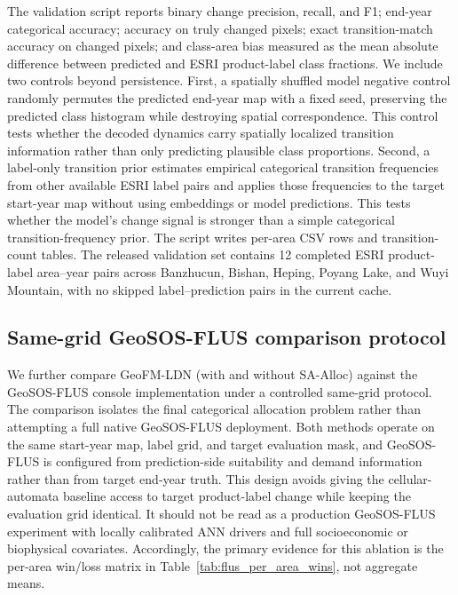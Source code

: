 \documentclass{article}
\begin{document}
The validation script reports binary change precision, recall, and F1; end-year categorical accuracy; accuracy on truly changed pixels; exact transition-match accuracy on changed pixels; and class-area bias measured as the mean absolute difference between predicted and ESRI product-label class fractions. We include two controls beyond persistence. First, a spatially shuffled model negative control randomly permutes the predicted end-year map with a fixed seed, preserving the predicted class histogram while destroying spatial correspondence. This control tests whether the decoded dynamics carry spatially localized transition information rather than only predicting plausible class proportions. Second, a label-only transition prior estimates empirical categorical transition frequencies from other available ESRI label pairs and applies those frequencies to the target start-year map without using embeddings or model predictions. This tests whether the model's change signal is stronger than a simple categorical transition-frequency prior. The script writes per-area CSV rows and transition-count tables. The released validation set contains 12 completed ESRI product-label area--year pairs across Banzhucun, Bishan, Heping, Poyang Lake, and Wuyi Mountain, with no skipped label--prediction pairs in the current cache.

\subsection{Same-grid GeoSOS-FLUS comparison protocol}
\label{sec:geosos_flus_protocol}

We further compare GeoFM-LDN (with and without SA-Alloc) against the GeoSOS-FLUS console implementation under a controlled same-grid protocol. The comparison isolates the final categorical allocation problem rather than attempting a full native GeoSOS-FLUS deployment. Both methods operate on the same start-year map, label grid, and target evaluation mask, and GeoSOS-FLUS is configured from prediction-side suitability and demand information rather than from target end-year truth. This design avoids giving the cellular-automata baseline access to target product-label change while keeping the evaluation grid identical. It should not be read as a production GeoSOS-FLUS experiment with locally calibrated ANN drivers and full socioeconomic or biophysical covariates. Accordingly, the primary evidence for this ablation is the per-area win/loss matrix in Table~\ref{tab:flus_per_area_wins}, not aggregate means.
\end{document}
